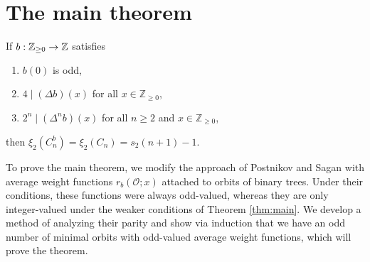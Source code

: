 \section{The main theorem}\label{sec:thm}

\begin{theorem}\label{thm:main}
If $b: \mathbb{Z}_{\geq 0}\to\mathbb{Z}$ satisfies 
\begin{enumerate}
    \item $b(0)$ is odd,
    \item $4\mid (\Delta b)(x)$ for all $x\in\mathbb{Z}_{\geq 0}$,
    \item $2^n\mid (\Delta^nb)(x)$ for all $n\geq 2$ and $x\in \mathbb{Z}_{\geq 0}$,
\end{enumerate}
then
$\xi_2(C_n^b)=\xi_2(C_n)=s_2(n+1)-1.$
\end{theorem}

To prove the main theorem, we modify the approach of Postnikov and Sagan with average weight functions $r_b(\mathcal{O}; x)$ attached to orbits of binary trees. Under their conditions, these functions were always odd-valued, whereas they are only integer-valued under the weaker conditions of Theorem \ref{thm:main}. We develop a method of analyzing their parity and show via induction that we have an odd number of minimal orbits with odd-valued average weight functions, which will prove the theorem.




